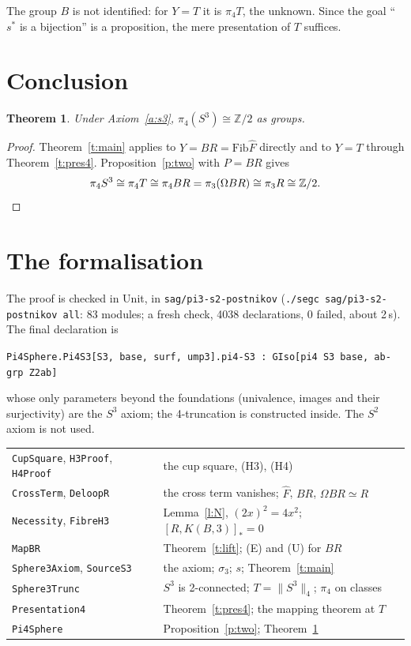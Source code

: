 \documentclass[11pt]{amsart}
\newtheorem{theorem}{Theorem}
\theoremstyle{definition}
\theoremstyle{remark}
\newcommand{\Om}{\Omega}
\newcommand{\Z}{\mathbb{Z}}
\newcommand{\code}[1]{\texttt{#1}}
\newcommand{\hc}[2]{[#1,#2]_*}
\newcommand{\Fib}{\mathrm{Fib}}
\newcommand{\tr}[1]{\|#1\|}
\newcommand{\Fh}{\hat F}
\begin{document}
The group $B$ is not identified: for $Y=T$ it is $\pi_4T$, the unknown. Since the goal
``$s^*$ is a bijection'' is a proposition, the mere presentation of $T$ suffices.

\section{Conclusion}

\begin{theorem}\label{t:final}
Under Axiom~\ref{a:s3}, $\pi_4(S^3)\cong\Z/2$ as groups.
\end{theorem}
\begin{proof}
Theorem~\ref{t:main} applies to $Y=BR=\Fib\Fh$ directly and to $Y=T$ through
Theorem~\ref{t:pres4}. Proposition~\ref{p:two} with $P=BR$ gives
\[\pi_4S^3\cong\pi_4T\cong\pi_4BR=\pi_3(\Om BR)\cong\pi_3R\cong\Z/2.\qedhere\]
\end{proof}

\section{The formalisation}\label{s:formal}

The proof is checked in Unit, in \code{sag/pi3-s2-postnikov} (\code{./segc
sag/pi3-s2-postnikov all}: 83 modules; a fresh check, 4038 declarations, 0 failed, about
2\,s). The final declaration is
\begin{center}
\code{Pi4Sphere.Pi4S3[S3, base, surf, ump3].pi4-S3 : GIso[pi4 S3 base, ab-grp Z2ab]}
\end{center}
whose only parameters beyond the foundations (univalence, images and their surjectivity)
are the $S^3$ axiom; the 4-truncation is constructed inside. The $S^2$ axiom is not used.

\smallskip
\begin{tabular}{@{}ll@{}}
\code{CupSquare}, \code{H3Proof}, \code{H4Proof} & the cup square, (H3), (H4)\\
\code{CrossTerm}, \code{DeloopR} & the cross term vanishes; $\Fh$, $BR$, $\Om BR\simeq R$\\
\code{Necessity}, \code{FibreH3} & Lemma~\ref{l:N}, $(2x)^2=4x^2$; $\hc R{K(B,3)}=0$\\
\code{MapBR} & Theorem~\ref{t:lift}; (E) and (U) for $BR$\\
\code{Sphere3Axiom}, \code{SourceS3} & the axiom; $\sigma_3$; $s$; Theorem~\ref{t:main}\\
\code{Sphere3Trunc} & $S^3$ is 2-connected; $T=\tr{S^3}_4$; $\pi_4$ on classes\\
\code{Presentation4} & Theorem~\ref{t:pres4}; the mapping theorem at $T$\\
\code{Pi4Sphere} & Proposition~\ref{p:two}; Theorem~\ref{t:final}
\end{tabular}
\end{document}
